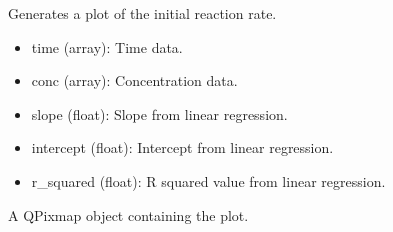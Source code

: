 \documentclass[a4paper,10pt,english]{sphinxmanual}
\begin{document}

\begin{fulllineitems}
\label{\detokenize{utils:src.utils.initial_rate.plot_initial_rate}}
\pysigstartsignatures
{}
\pysigstopsignatures
\sphinxAtStartPar
Generates a plot of the initial reaction rate.
\begin{description}
\begin{itemize}
\item {} 
\sphinxAtStartPar
time (array): Time data.

\item {} 
\sphinxAtStartPar
conc (array): Concentration data.

\item {} 
\sphinxAtStartPar
slope (float): Slope from linear regression.

\item {} 
\sphinxAtStartPar
intercept (float): Intercept from linear regression.

\item {} 
\sphinxAtStartPar
r\_squared (float): R squared value from linear regression.

\end{itemize}

\sphinxAtStartPar
A QPixmap object containing the plot.

\end{description}

\end{fulllineitems}

\end{document}
